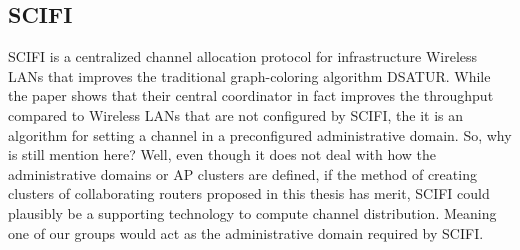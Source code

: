 \subsection{SCIFI}
SCIFI \cite{SCIFI} is a centralized channel allocation protocol for infrastructure Wireless LANs that improves the traditional graph-coloring algorithm DSATUR. 
While the paper shows that their central coordinator in fact improves the throughput compared to Wireless LANs that are not configured by SCIFI, the it is an algorithm for setting a channel in a preconfigured administrative domain. So, why is still mention here? Well, even though it does not deal with how the administrative domains
or AP clusters are defined, if the method of creating clusters of collaborating routers proposed in this thesis has merit,
SCIFI could plausibly be a supporting technology to compute channel distribution. Meaning one of our groups would act as the administrative domain required by SCIFI. 


